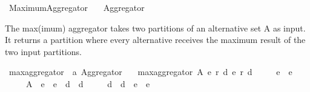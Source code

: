 %
\begin{isabellebody}%
%
%
\isadelimdocument
\isanewline
%
\endisadelimdocument
%
\isatagdocument
\isanewline
\isanewline
%
\isamarkuptrue%
%
\endisatagdocument
{\isafolddocument}%
%
\isadelimdocument
%
\endisadelimdocument
%
\isadelimtheory
%
\endisadelimtheory
%
\isatagtheory
{}\isamarkupfalse%
\ Maximum{\isacharunderscore}{\kern0pt}Aggregator\isanewline
\ \ \ {\isachardoublequoteopen}{\isachardot}{\kern0pt}{\isachardot}{\kern0pt}{\isacharslash}{\kern0pt}Aggregator{\isachardoublequoteclose}\isanewline
{}%
\endisatagtheory
{\isafoldtheory}%
%
\isadelimtheory
%
\endisadelimtheory
%
\begin{isamarkuptext}%
The max(imum) aggregator takes two partitions of an alternative set A as
input. It returns a partition where every alternative receives the maximum
result of the two input partitions.%
\end{isamarkuptext}\isamarkuptrue%
%
\isadelimdocument
%
\endisadelimdocument
%
\isatagdocument
%
\isamarkuptrue%
%
\endisatagdocument
{\isafolddocument}%
%
\isadelimdocument
%
\endisadelimdocument
{}\isamarkupfalse%
\ max{\isacharunderscore}{\kern0pt}aggregator\ {\isacharcolon}{\kern0pt}{\isacharcolon}{\kern0pt}\ {\isachardoublequoteopen}{\isacharprime}{\kern0pt}a\ Aggregator{\isachardoublequoteclose}\ \isanewline
\ \ {\isachardoublequoteopen}max{\isacharunderscore}{\kern0pt}aggregator\ A\ {\isacharparenleft}{\kern0pt}e{}{\isacharcomma}{\kern0pt}\ r{}{\isacharcomma}{\kern0pt}\ d{}{\isacharparenright}{\kern0pt}\ {\isacharparenleft}{\kern0pt}e{}{\isacharcomma}{\kern0pt}\ r{}{\isacharcomma}{\kern0pt}\ d{}{\isacharparenright}{\kern0pt}\ {\isacharequal}{\kern0pt}\isanewline
\ \ \ \ {\isacharparenleft}{\kern0pt}e{}\ {\isasymunion}\ e{}{\isacharcomma}{\kern0pt}\isanewline
\ \ \ \ \ A\ {\isacharminus}{\kern0pt}\ {\isacharparenleft}{\kern0pt}e{}\ {\isasymunion}\ e{}\ {\isasymunion}\ d{}\ {\isasymunion}\ d{}{\isacharparenright}{\kern0pt}{\isacharcomma}{\kern0pt}\isanewline
\ \ \ \ \ {\isacharparenleft}{\kern0pt}d{}\ {\isasymunion}\ d{}{\isacharparenright}{\kern0pt}\ {\isacharminus}{\kern0pt}\ {\isacharparenleft}{\kern0pt}e{}\ {\isasymunion}\ e{}{\isacharparenright}{\kern0pt}{\isacharparenright}{\kern0pt}{\isachardoublequoteclose}%

\end{isabellebody}
